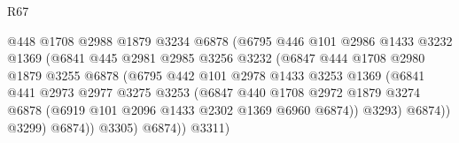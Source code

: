 \begin{lexlean}{R67}
\begin{coremodule}
                                    @448
                                    @1708
                                    @2988
                                    @1879
                                    @3234
                                    @6878
                                    (@6795
                                      @446
                                      @101
                                      @2986
                                      @1433
                                      @3232
                                      @1369
                                      (@6841
                                        @445
                                        @2981
                                        @2985
                                        @3256
                                        @3232
                                        (@6847
                                          @444
                                          @1708
                                          @2980
                                          @1879
                                          @3255
                                          @6878
                                          (@6795
                                            @442
                                            @101
                                            @2978
                                            @1433
                                            @3253
                                            @1369
                                            (@6841
                                              @441
                                              @2973
                                              @2977
                                              @3275
                                              @3253
                                              (@6847
                                                @440
                                                @1708
                                                @2972
                                                @1879
                                                @3274
                                                @6878
                                                (@6919 @101 @2096 @1433 @2302 @1369 @6960 @6874))
                                              @3293)
                                            @6874))
                                        @3299)
                                      @6874))
                                  @3305)
                                @6874))
                            @3311)

\end{coremodule}
\end{lexlean}
